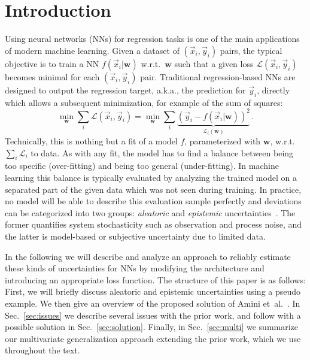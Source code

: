 \documentclass{article}
\begin{document}
\section{Introduction}
Using neural networks (NNs) for regression tasks is one of the main applications of modern machine learning.
Given a dataset of $(\vec{x}_i, \vec{y}_i)$ pairs, the typical objective is to train a NN $f(\vec{x}_i | \bm{w})$ w.r.t.\ $\bm{w}$ such that a given loss $\mathcal{L}(\vec{x}_i, \vec{y}_i)$ becomes minimal for each $(\vec{x}_i, \vec{y}_i)$ pair.
Traditional regression-based NNs are designed to output the regression target, a.k.a., the prediction for $\vec{y}_i$, directly which allows a subsequent minimization, for example of the sum of squares:
\begin{equation}
    \min\limits_{\bm{w}} \sum\limits_i \mathcal{L}(\vec{x}_i, \vec{y}_i) = \min\limits_{\bm{w}} \sum\limits_i  \underbrace{\left( \vec{y}_i - f(\vec{x}_i | \bm{w}) \right)^2}_{\mathcal{L}_i(\bm{w})} \,.
\end{equation}
Technically, this is nothing but a fit of a model $f$, parameterized with $\bm{w}$, w.r.t.\ $\sum_i \mathcal{L}_i$ to data.
As with any fit, the model has to find a balance between being too specific (over-fitting) and being too general (under-fitting).
In machine learning this balance is typically evaluated by analyzing the trained model on a separated part of the given data which was not seen during training.
In practice, no model will be able to describe this evaluation sample perfectly and deviations can be categorized into two groups: \textit{aleatoric} and \textit{epistemic} uncertainties~\cite{kendall17}. The former quantifies system stochasticity such as observation and process noise, and the latter is model-based or subjective uncertainty due to limited data.

In the following we will describe and analyze an approach to reliably estimate these kinds of uncertainties for NNs by modifying the architecture and introducing an appropriate loss function.
The structure of this paper is as follows:
First, we  will briefly discuss aleatoric and epistemic uncertainties using a pseudo example.
We then give an overview of the proposed solution of Amini et\ al.~\cite{amini20}.
In Sec.~\ref{sec:issues} we describe several issues with the prior work, and follow with a possible solution in Sec.~\ref{sec:solution}.
Finally, in Sec.~\ref{sec:multi} we summarize our multivariate generalization approach extending the prior work, which we use throughout the text.
\end{document}
